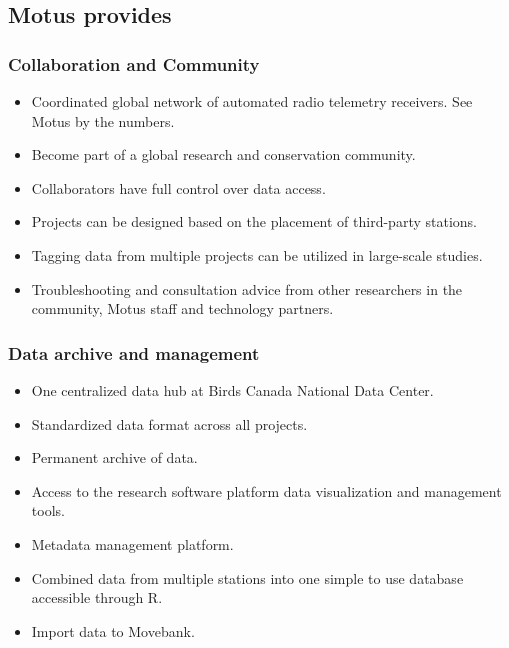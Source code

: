 \documentclass[
]{article}
\providecommand{\tightlist}{%
  \setlength{\itemsep}{0pt}\setlength{\parskip}{0pt}}
\begin{document}
\hypertarget{motus-provides}{%
\subsection{Motus provides}\label{motus-provides}}

\hypertarget{collaboration-and-community}{%
\subsubsection{Collaboration and
Community}\label{collaboration-and-community}}

\begin{itemize}
\tightlist
\item
  Coordinated global network of automated radio telemetry receivers. See
  Motus by the numbers.
\item
  Become part of a global research and conservation community.
\item
  Collaborators have full control over data access.
\item
  Projects can be designed based on the placement of third-party
  stations.
\item
  Tagging data from multiple projects can be utilized in large-scale
  studies.
\item
  Troubleshooting and consultation advice from other researchers in the
  community, Motus staff and technology partners.
\end{itemize}

\hypertarget{data-archive-and-management}{%
\subsubsection{Data archive and
management}\label{data-archive-and-management}}

\begin{itemize}
\tightlist
\item
  One centralized data hub at Birds Canada National Data Center.
\item
  Standardized data format across all projects.
\item
  Permanent archive of data.
\item
  Access to the research software platform data visualization and
  management tools.
\item
  Metadata management platform.
\item
  Combined data from multiple stations into one simple to use database
  accessible through R.
\item
  Import data to Movebank.
\end{itemize}
\end{document}

